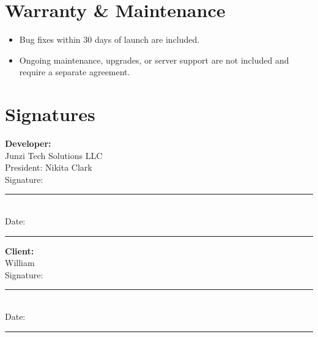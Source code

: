 \documentclass[11pt,letterpaper]{article}
\newcommand{\ClientName}{William}
\begin{document}
\section{Warranty \& Maintenance}
\begin{itemize}[leftmargin=*]
\item Bug fixes within 30 days of launch are included.
\item Ongoing maintenance, upgrades, or server support are not included and require a separate agreement.
\end{itemize}

\vspace{2em}

\section*{Signatures}

\begin{minipage}{0.45\textwidth}
\textbf{Developer:}\\
Junzi Tech Solutions LLC\\
President: Nikita Clark\\[2em]
Signature: \rule{6cm}{0.4pt}\\[0.5em]
Date: \rule{4cm}{0.4pt}
\end{minipage}
\hfill
\begin{minipage}{0.45\textwidth}
\textbf{Client:}\\
\ClientName{}\\[3em]
Signature: \rule{6cm}{0.4pt}\\[0.5em]
Date: \rule{4cm}{0.4pt}
\end{minipage}
\end{document}
